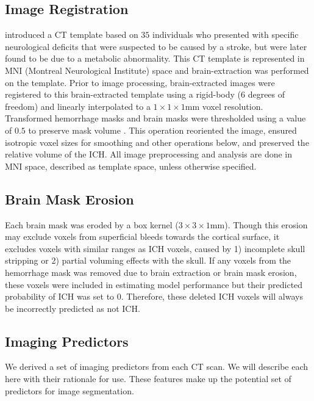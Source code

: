 \subsection{Image Registration}
\citet{rorden_age-specific_2012} introduced a CT template based on $35$ individuals who presented with specific neurological deficits that were suspected to be caused by a stroke, but were later found to be due to a metabolic abnormality.  This CT template is represented in MNI (Montreal Neurological Institute) space and brain-extraction was performed on the template.  Prior to image processing, brain-extracted images were registered to this brain-extracted template using a rigid-body (6 degrees of freedom) and linearly interpolated to a $1\times1\times1$mm voxel resolution.  Transformed hemorrhage masks and brain masks were thresholded using a value of $0.5$ to preserve mask volume \cite{flirt_reg}. This operation reoriented the image, ensured isotropic voxel sizes for smoothing and other operations below, and preserved the relative volume of the ICH.  All image preprocessing and analysis are done in MNI space, described as template space, unless otherwise specified.


\subsection{Brain Mask Erosion}
Each brain mask was eroded by a box kernel ($3\times3\times1$mm).  Though this erosion may exclude voxels from superficial bleeds towards the cortical surface, it excludes voxels with similar ranges as ICH voxels, caused by 1) incomplete skull stripping or 2) partial voluming effects with the skull.  If any voxels from the hemorrhage mask was removed due to brain extraction or brain mask erosion, these voxels were included in estimating model performance but their predicted probability of ICH was set to $0$.  Therefore, these deleted ICH voxels will always be incorrectly predicted as not ICH.  




\subsection{Imaging Predictors}
We derived a set of imaging predictors from each CT scan.  We will describe each here with their rationale for use.  These features make up the potential set of predictors for image segmentation.

